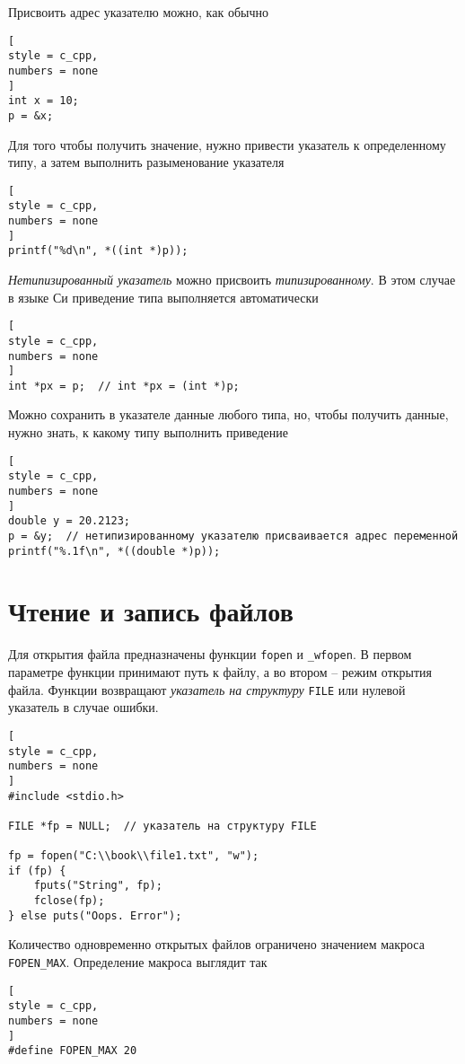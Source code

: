 \documentclass[%
	11pt,
	a4paper,
	utf8,
		]{article}
\begin{document}
Присвоить адрес указателю можно, как обычно
\begin{lstlisting}[
style = c_cpp,
numbers = none
]
int x = 10;
p = &x;
\end{lstlisting}

Для того чтобы получить значение, нужно привести указатель к определенному типу, а затем выполнить разыменование указателя
\begin{lstlisting}[
style = c_cpp,
numbers = none
]
printf("%d\n", *((int *)p));
\end{lstlisting}

\emph{Нетипизированный указатель} можно присвоить \emph{типизированному}. В этом случае в языке Си приведение типа выполняется автоматически
\begin{lstlisting}[
style = c_cpp,
numbers = none
]
int *px = p;  // int *px = (int *)p;
\end{lstlisting}

Можно сохранить в указателе данные любого типа, но, чтобы получить данные, нужно знать, к какому типу выполнить приведение
\begin{lstlisting}[
style = c_cpp,
numbers = none
]
double y = 20.2123;
p = &y;  // нетипизированному указателю присваивается адрес переменной
printf("%.1f\n", *((double *)p));
\end{lstlisting}

\section{Чтение и запись файлов}

Для открытия файла предназначены функции \verb|fopen| и \verb|_wfopen|. В первом параметре функции принимают путь к файлу, а во втором -- режим открытия файла. Функции возвращают \emph{указатель на структуру} \verb|FILE| или нулевой указатель в случае ошибки.
\begin{lstlisting}[
style = c_cpp,
numbers = none
]
#include <stdio.h>

FILE *fp = NULL;  // указатель на структуру FILE

fp = fopen("C:\\book\\file1.txt", "w");
if (fp) {
    fputs("String", fp);
    fclose(fp);
} else puts("Oops. Error");
\end{lstlisting}

Количество одновременно открытых файлов ограничено значением макроса \verb|FOPEN_MAX|. Определение макроса выглядит так
\begin{lstlisting}[
style = c_cpp,
numbers = none
]
#define FOPEN_MAX 20
\end{lstlisting}
\end{document}
